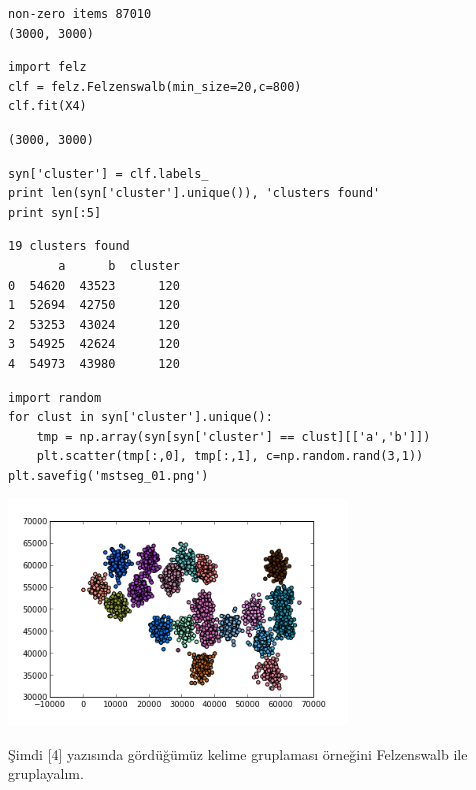 \documentclass[12pt,fleqn]{article}\usepackage{../../common}
\begin{document}
\begin{verbatim}
non-zero items 87010
(3000, 3000)
\end{verbatim}

\begin{verbatim}
import felz
clf = felz.Felzenswalb(min_size=20,c=800)
clf.fit(X4)
\end{verbatim}

\begin{verbatim}
(3000, 3000)
\end{verbatim}

\begin{verbatim}
syn['cluster'] = clf.labels_
print len(syn['cluster'].unique()), 'clusters found'
print syn[:5]
\end{verbatim}

\begin{verbatim}
19 clusters found
       a      b  cluster
0  54620  43523      120
1  52694  42750      120
2  53253  43024      120
3  54925  42624      120
4  54973  43980      120
\end{verbatim}

\begin{verbatim}
import random
for clust in syn['cluster'].unique():
    tmp = np.array(syn[syn['cluster'] == clust][['a','b']])
    plt.scatter(tmp[:,0], tmp[:,1], c=np.random.rand(3,1))
plt.savefig('mstseg_01.png')
\end{verbatim}

\includegraphics[height=6cm]{mstseg_01.png}

Şimdi [4] yazısında gördüğümüz kelime gruplaması örneğini Felzenswalb ile
gruplayalım.
\end{document}
